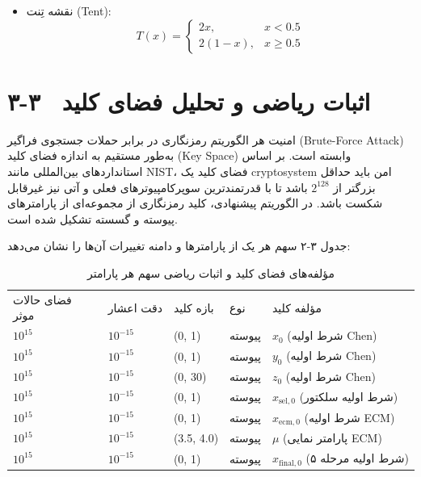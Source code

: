 \begin{itemize}
    \item نقشه تِنت (‎Tent‎):
    \begin{equation}
    T(x) = \begin{cases}
    2x, & x < 0.5 \\
    2(1-x), & x \geq 0.5
    \end{cases}
    \label{eq:ch3-tent}
    \end{equation}
\end{itemize}

\section{۳-۳  اثبات ریاضی و تحلیل فضای کلید}

امنیت هر الگوریتم رمزنگاری در برابر حملات جستجوی فراگیر (‎Brute-Force Attack‎) به‌طور مستقیم به اندازه فضای کلید (‎Key Space‎) وابسته است. بر اساس استانداردهای بین‌المللی مانند ‎NIST‎، فضای کلید یک ‎cryptosystem‎ امن باید حداقل بزرگتر از $2^{128}$ باشد تا با قدرتمندترین سوپرکامپیوترهای فعلی و آتی نیز غیرقابل شکست باشد. در الگوریتم پیشنهادی، کلید رمزنگاری از مجموعه‌ای از پارامترهای پیوسته و گسسته تشکیل شده است.

جدول ۳-۲ سهم هر یک از پارامترها و دامنه تغییرات آن‌ها را نشان می‌دهد:

\begin{table}[h]
\centering
\small
\begin{tabular}{lllll}
\hline
فضای حالات موثر & دقت اعشار & بازه کلید & نوع & مؤلفه کلید \\
$10^{15}$ & $10^{-15}$ & ‎(0, 1)‎ & پیوسته & $x_0$ (شرط اولیه ‎Chen‎) \\
$10^{15}$ & $10^{-15}$ & ‎(0, 1)‎ & پیوسته & $y_0$ (شرط اولیه ‎Chen‎) \\
$10^{15}$ & $10^{-15}$ & ‎(0, 30)‎ & پیوسته & $z_0$ (شرط اولیه ‎Chen‎) \\
$10^{15}$ & $10^{-15}$ & ‎(0, 1)‎ & پیوسته & $x_{\mathrm{sel},0}$ (شرط اولیه سلکتور) \\
$10^{15}$ & $10^{-15}$ & ‎(0, 1)‎ & پیوسته & $x_{\mathrm{ecm},0}$ (شرط اولیه ‎ECM‎) \\
$10^{15}$ & $10^{-15}$ & ‎(3.5, 4.0)‎ & پیوسته & $\mu$ (پارامتر نمایی ‎ECM‎) \\
$10^{15}$ & $10^{-15}$ & ‎(0, 1)‎ & پیوسته & $x_{\mathrm{final},0}$ (شرط اولیه مرحله ۵) \\
\hline
\end{tabular}
\caption{مؤلفه‌های فضای کلید و اثبات ریاضی سهم هر پارامتر}
\end{table}

